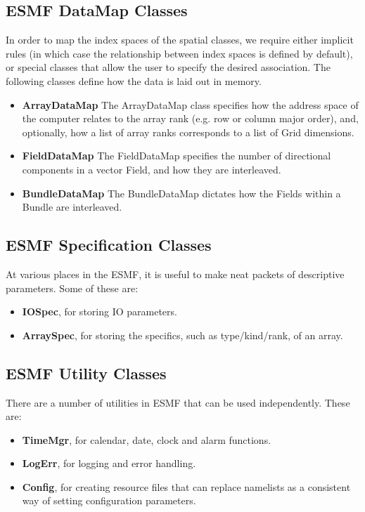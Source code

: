 \subsection{ESMF DataMap Classes}

In order to map the index spaces of the spatial classes,
we require either implicit rules (in which case the relationship 
between index spaces is defined by default), or special classes that 
allow the user to specify the desired association.  The following
classes define how the data is laid out in memory.

\begin{itemize}

\item {\bf ArrayDataMap} The ArrayDataMap class specifies how the 
address space of the computer relates to the array rank (e.g. row 
or column major order), and, optionally, how a list of array ranks 
corresponds to a list of Grid dimensions.   

\item {\bf FieldDataMap} The FieldDataMap specifies the number of 
directional components in a vector Field, and how they are interleaved.

\item {\bf BundleDataMap} The BundleDataMap dictates how the Fields
within a Bundle are interleaved.  

\end{itemize}

\subsection{ESMF Specification Classes}

At various places in the ESMF, it is useful to make neat packets
of descriptive parameters.  Some of these are:
\begin{itemize}
\item {\bf IOSpec}, for storing IO parameters.
\item {\bf ArraySpec}, for storing the specifics, such as type/kind/rank,
of an array.
\end{itemize}

\subsection{ESMF Utility Classes}

There are a number of utilities in ESMF that can be used independently.
These are:
\begin{itemize}
\item {\bf TimeMgr}, for calendar, date, clock and alarm functions.
\item {\bf LogErr}, for logging and error handling.
\item {\bf Config}, for creating resource files that can replace namelists
as a consistent way of setting configuration parameters.
\end{itemize}

